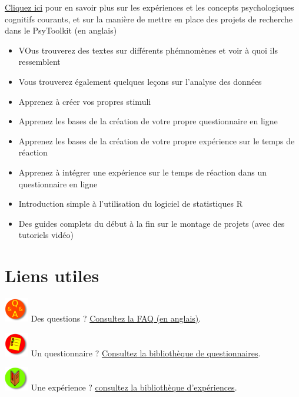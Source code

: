 \documentclass[
]{book}
\providecommand{\tightlist}{%
  \setlength{\itemsep}{0pt}\setlength{\parskip}{0pt}}
\begin{document}
\href{https://www.psytoolkit.org/lessons/}{Cliquez ici} pour en savoir
plus sur les expériences et les concepts psychologiques cognitifs
courants, et sur la manière de mettre en place des projets de recherche
dans le PsyToolkit (en anglais)

\begin{itemize}
\tightlist
\item
  VOus trouverez des textes sur différents phémnomènes et voir à quoi
  ils ressemblent
\item
  Vous trouverez également quelques leçons sur l'analyse des données
\item
  Apprenez à créer vos propres stimuli
\item
  Apprenez les bases de la création de votre propre questionnaire en
  ligne
\item
  Apprenez les bases de la création de votre propre expérience sur le
  temps de réaction
\item
  Apprenez à intégrer une expérience sur le temps de réaction dans un
  questionnaire en ligne
\item
  Introduction simple à l'utilisation du logiciel de statistiques R
\item
  Des guides complets du début à la fin sur le montage de projets (avec
  des tutoriels vidéo)
\end{itemize}

\hypertarget{liens-utiles}{%
\section{Liens utiles}\label{liens-utiles}}

\includegraphics{img/qaa.png} Des questions ?
\href{https://www.psytoolkit.org/faq.html}{Consultez la FAQ (en
anglais)}.

\includegraphics{img/surveys.png} Un questionnaire ?
\href{https://www.psytoolkit.org/survey-library}{Consultez la
bibliothèque de questionnaires}.

\includegraphics{img/lib.png} Une expérience ?
\href{https://www.psytoolkit.org/experiment-library}{consultez la
bibliothèque d'expériences}.
\end{document}
